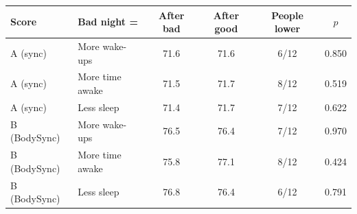 \begin{tabular}{llcccc}
\toprule
Score & Bad night = & After bad & After good & People lower & $p$ \\
\midrule
A (sync) & More wake-ups & 71.6 & 71.6 & 6/12 & 0.850 \\
A (sync) & More time awake & 71.5 & 71.7 & 8/12 & 0.519 \\
A (sync) & Less sleep & 71.4 & 71.7 & 7/12 & 0.622 \\
B (BodySync) & More wake-ups & 76.5 & 76.4 & 7/12 & 0.970 \\
B (BodySync) & More time awake & 75.8 & 77.1 & 8/12 & 0.424 \\
B (BodySync) & Less sleep & 76.8 & 76.4 & 6/12 & 0.791 \\
\bottomrule
\end{tabular}
